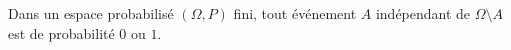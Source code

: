 Dans un espace probabilisé $(\Omega, P)$ fini, tout événement $A$ indépendant de $\Omega \setminus A$  est de probabilité $0$ ou $1$.

\begin{reponses}
\end{reponses}

